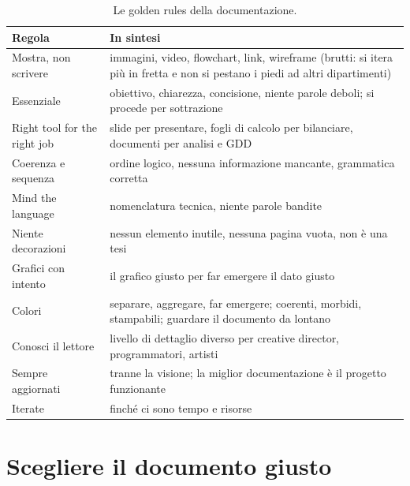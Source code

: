 \begin{table}[htbp]
  \centering
  \small
  \begin{tabular}{@{}p{}p{}@{}}
    \toprule
    \textbf{Regola} & \textbf{In sintesi} \\
    \midrule
    Mostra, non scrivere & immagini, video, flowchart, link, wireframe
                           (brutti: si itera più in fretta e non si pestano i
                           piedi ad altri dipartimenti) \\
    Essenziale & obiettivo, chiarezza, concisione, niente parole deboli; si
                 procede per sottrazione \\
    Right tool for the right job & slide per presentare, fogli di calcolo per
                                   bilanciare, documenti per analisi e GDD \\
    Coerenza e sequenza & ordine logico, nessuna informazione mancante,
                          grammatica corretta \\
    Mind the language & nomenclatura tecnica, niente parole bandite \\
    Niente decorazioni & nessun elemento inutile, nessuna pagina vuota, non è
                         una tesi \\
    Grafici con intento & il grafico giusto per far emergere il dato giusto \\
    Colori & separare, aggregare, far emergere; coerenti, morbidi,
             stampabili; guardare il documento da lontano \\
    Conosci il lettore & livello di dettaglio diverso per creative director,
                         programmatori, artisti \\
    Sempre aggiornati & tranne la visione; la miglior documentazione è il
                        progetto funzionante \\
    Iterate & finché ci sono tempo e risorse \\
    \bottomrule
  \end{tabular}
  \caption{Le golden rules della documentazione.}
  \label{tab:golden-rules}
\end{table}

\section{Scegliere il documento giusto}
\label{sec:scegliere-documento}

